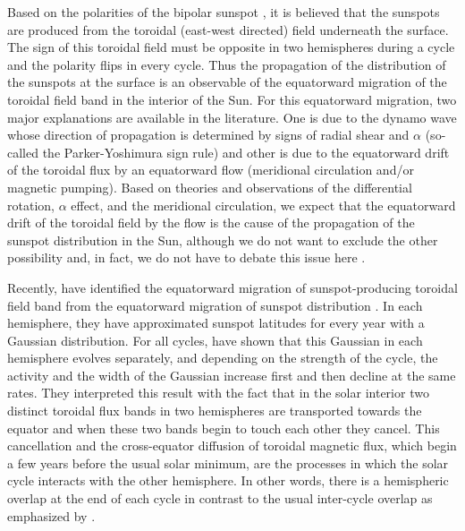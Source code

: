 \documentclass[preprint2,times,tighten]{aastex61}
\begin{document}
Based on the polarities of the bipolar sunspot \citep[Hale polarity rule;][]{Hale19}, it is believed that the
sunspots are produced from the toroidal (east-west directed) field underneath the surface. The sign of this toroidal field
must be opposite in two hemispheres during a cycle and the polarity flips in every cycle.
Thus the propagation of the distribution of the sunspots at the surface is an observable of the equatorward migration of the toroidal field band in the interior of the Sun.
 For this equatorward migration, two major explanations are available in the literature. 
One is due to the dynamo wave whose direction of propagation is determined by signs of radial shear and $\alpha$ (so-called the Parker-Yoshimura sign rule)
and other is due to the equatorward drift of the toroidal flux by an equatorward flow (meridional circulation and/or magnetic pumping).
Based on theories and observations of the differential rotation, $\alpha$ effect, and the meridional circulation, we expect that the equatorward drift of the toroidal field by the flow is the cause of the propagation of the sunspot distribution in the Sun,
although we do not want to exclude the other possibility and, in fact, we do not have to debate this issue here \citep{KC16, CDB17}.

Recently, \citet{CS16} have identified the equatorward migration of sunspot-producing toroidal field band
from the equatorward migration of sunspot distribution \citep[see also][]{2011SoPh..273..221H, Jiang11}.
In each hemisphere, they have approximated sunspot latitudes for every year with a Gaussian distribution.
For all cycles, \citet{CS16}  have shown that this Gaussian in each hemisphere evolves separately, and depending on the strength of the
cycle, the activity and the width of the Gaussian increase first and then decline at the same rates.
They interpreted this result with the fact that in the solar interior two distinct toroidal flux bands in two hemispheres
are transported towards the equator and when these two bands begin to touch each other they cancel. This
cancellation and the cross-equator diffusion of toroidal magnetic flux, which begin a few years before the usual solar minimum,
are the processes in which the solar cycle interacts with the other hemisphere. In other words, there is a hemispheric overlap
at the end of each cycle in contrast to the usual inter-cycle overlap as emphasized by \citet{2007ApJ...659..801C}.
\end{document}
